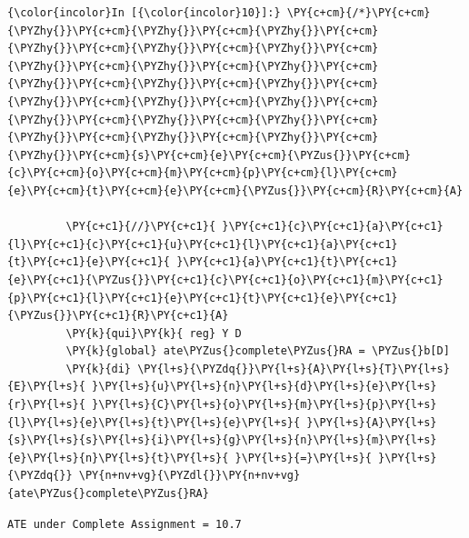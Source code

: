 \documentclass[11pt,notitlepage]{article}\usepackage[]{graphicx}\usepackage[]{color}
\makeatletter
\newenvironment{kframe}{%
 \def\at@end@of@kframe{}%
 \ifinner\ifhmode%
  \def\at@end@of@kframe{\end{minipage}}%
  \begin{minipage}{\columnwidth}%
 \fi\fi%
 \def\FrameCommand##1{\hskip\@totalleftmargin \hskip-\fboxsep
 \colorbox{shadecolor}{##1}\hskip-\fboxsep
     \hskip-\linewidth \hskip-\@totalleftmargin \hskip\columnwidth}%
 \MakeFramed {\advance\hsize-\width
   \@totalleftmargin\z@ \linewidth\hsize
   \@setminipage}}%
 {\par\unskip\endMakeFramed%
 \at@end@of@kframe}
\newenvironment{knitrout}{}{} %
\makeatother
\begin{document}
\begin{enumerate}[a)]
\begin{knitrout}
\begin{kframe}
    \begin{Verbatim}[commandchars=\\\{\}]
{\color{incolor}In [{\color{incolor}10}]:} \PY{c+cm}{/*}\PY{c+cm}{\PYZhy{}}\PY{c+cm}{\PYZhy{}}\PY{c+cm}{\PYZhy{}}\PY{c+cm}{\PYZhy{}}\PY{c+cm}{\PYZhy{}}\PY{c+cm}{\PYZhy{}}\PY{c+cm}{\PYZhy{}}\PY{c+cm}{\PYZhy{}}\PY{c+cm}{\PYZhy{}}\PY{c+cm}{\PYZhy{}}\PY{c+cm}{\PYZhy{}}\PY{c+cm}{\PYZhy{}}\PY{c+cm}{\PYZhy{}}\PY{c+cm}{\PYZhy{}}\PY{c+cm}{\PYZhy{}}\PY{c+cm}{\PYZhy{}}\PY{c+cm}{\PYZhy{}}\PY{c+cm}{\PYZhy{}}\PY{c+cm}{\PYZhy{}}\PY{c+cm}{\PYZhy{}}\PY{c+cm}{\PYZhy{}}\PY{c+cm}{\PYZhy{}}\PY{c+cm}{s}\PY{c+cm}{e}\PY{c+cm}{\PYZus{}}\PY{c+cm}{c}\PY{c+cm}{o}\PY{c+cm}{m}\PY{c+cm}{p}\PY{c+cm}{l}\PY{c+cm}{e}\PY{c+cm}{t}\PY{c+cm}{e}\PY{c+cm}{\PYZus{}}\PY{c+cm}{R}\PY{c+cm}{A}
         
         \PY{c+c1}{//}\PY{c+c1}{ }\PY{c+c1}{c}\PY{c+c1}{a}\PY{c+c1}{l}\PY{c+c1}{c}\PY{c+c1}{u}\PY{c+c1}{l}\PY{c+c1}{a}\PY{c+c1}{t}\PY{c+c1}{e}\PY{c+c1}{ }\PY{c+c1}{a}\PY{c+c1}{t}\PY{c+c1}{e}\PY{c+c1}{\PYZus{}}\PY{c+c1}{c}\PY{c+c1}{o}\PY{c+c1}{m}\PY{c+c1}{p}\PY{c+c1}{l}\PY{c+c1}{e}\PY{c+c1}{t}\PY{c+c1}{e}\PY{c+c1}{\PYZus{}}\PY{c+c1}{R}\PY{c+c1}{A}
         \PY{k}{qui}\PY{k}{ reg} Y D
         \PY{k}{global} ate\PYZus{}complete\PYZus{}RA = \PYZus{}b[D]
         \PY{k}{di} \PY{l+s}{\PYZdq{}}\PY{l+s}{A}\PY{l+s}{T}\PY{l+s}{E}\PY{l+s}{ }\PY{l+s}{u}\PY{l+s}{n}\PY{l+s}{d}\PY{l+s}{e}\PY{l+s}{r}\PY{l+s}{ }\PY{l+s}{C}\PY{l+s}{o}\PY{l+s}{m}\PY{l+s}{p}\PY{l+s}{l}\PY{l+s}{e}\PY{l+s}{t}\PY{l+s}{e}\PY{l+s}{ }\PY{l+s}{A}\PY{l+s}{s}\PY{l+s}{s}\PY{l+s}{i}\PY{l+s}{g}\PY{l+s}{n}\PY{l+s}{m}\PY{l+s}{e}\PY{l+s}{n}\PY{l+s}{t}\PY{l+s}{ }\PY{l+s}{=}\PY{l+s}{ }\PY{l+s}{\PYZdq{}} \PY{n+nv+vg}{\PYZdl{}}\PY{n+nv+vg}{ate\PYZus{}complete\PYZus{}RA}
\end{Verbatim}

    \begin{Verbatim}[commandchars=\\\{\}]
ATE under Complete Assignment = 10.7
    \end{Verbatim}


\end{kframe}
\end{knitrout}
\end{enumerate}
\end{document}

